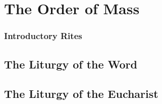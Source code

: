 \chapter[The Order of Mass][The Order of Mass]{The Order of Mass}
\begin{english}
\subsection*{Introductory Rites}




\newpage
\section[The Liturgy of the Word]{The Liturgy of the Word}









\newpage
{}









\newpage
{}


\newpage






\newpage
{}










\newpage
\section[The Liturgy of the Eucharist]{The Liturgy of the Eucharist}



\end{english}
